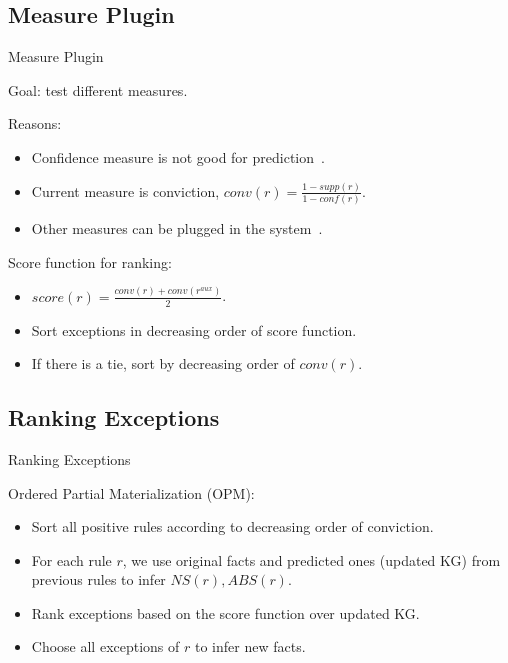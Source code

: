 \documentclass{beamer}
\begin{document}
\subsection{Measure Plugin}

\begin{frame}{Measure Plugin}

Goal: test different measures.

Reasons:
\begin{itemize}
	\item Confidence measure is not good for prediction~\cite{ref1}.
	\item Current measure is conviction, $conv(r) = \frac{1 - supp(r)}{1 - conf(r)}$.
	\item {
		Other measures can be plugged in the system~\cite{ref2}.
		\pause
	}
\end{itemize}

Score function for ranking:
\begin{itemize}
	\item $score(r) = \frac{conv(r) + conv(r^{aux})}{2}$.
	\item Sort exceptions in decreasing order of score function.
	\item If there is a tie, sort by decreasing order of $conv(r)$.
\end{itemize}

\end{frame}

\subsection{Ranking Exceptions}

\begin{frame}{Ranking Exceptions}

Ordered Partial Materialization (OPM):
\begin{itemize}
	\item Sort all positive rules according to decreasing order of conviction.
	\item For each rule $r$, we use original facts and predicted ones (updated KG) from previous rules to infer $NS(r), ABS(r)$.
	\item Rank exceptions based on the score function over updated KG.
	\item Choose all exceptions of $r$ to infer new facts.
\end{itemize}

\end{frame}
\end{document}
